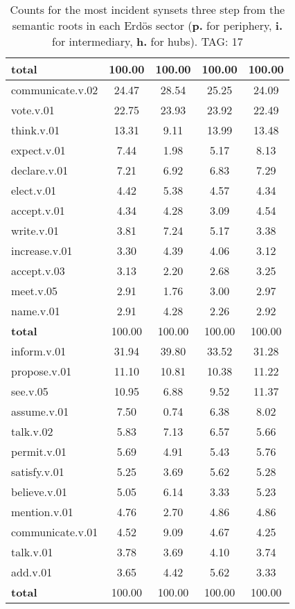 \begin{table}[h!]
\begin{center}
\begin{tabular}{| l || c | c | c | c |}
{{\bf total}} & 100.00  & 100.00  & 100.00  & 100.00 \\\hline\hline\hline
communicate.v.02 & 24.47  & 28.54  & 25.25  & 24.09 \\\hline
vote.v.01 & 22.75  & 23.93  & 23.92  & 22.49 \\\hline
think.v.01 & 13.31  & 9.11  & 13.99  & 13.48 \\\hline
expect.v.01 & 7.44  & 1.98  & 5.17  & 8.13 \\\hline
declare.v.01 & 7.21  & 6.92  & 6.83  & 7.29 \\\hline
elect.v.01 & 4.42  & 5.38  & 4.57  & 4.34 \\\hline
accept.v.01 & 4.34  & 4.28  & 3.09  & 4.54 \\\hline
write.v.01 & 3.81  & 7.24  & 5.17  & 3.38 \\\hline
increase.v.01 & 3.30  & 4.39  & 4.06  & 3.12 \\\hline
accept.v.03 & 3.13  & 2.20  & 2.68  & 3.25 \\\hline
meet.v.05 & 2.91  & 1.76  & 3.00  & 2.97 \\\hline
name.v.01 & 2.91  & 4.28  & 2.26  & 2.92 \\\hline\hline
{{\bf total}} & 100.00  & 100.00  & 100.00  & 100.00 \\\hline\hline\hline
inform.v.01 & 31.94  & 39.80  & 33.52  & 31.28 \\\hline
propose.v.01 & 11.10  & 10.81  & 10.38  & 11.22 \\\hline
see.v.05 & 10.95  & 6.88  & 9.52  & 11.37 \\\hline
assume.v.01 & 7.50  & 0.74  & 6.38  & 8.02 \\\hline
talk.v.02 & 5.83  & 7.13  & 6.57  & 5.66 \\\hline
permit.v.01 & 5.69  & 4.91  & 5.43  & 5.76 \\\hline
satisfy.v.01 & 5.25  & 3.69  & 5.62  & 5.28 \\\hline
believe.v.01 & 5.05  & 6.14  & 3.33  & 5.23 \\\hline
mention.v.01 & 4.76  & 2.70  & 4.86  & 4.86 \\\hline
communicate.v.01 & 4.52  & 9.09  & 4.67  & 4.25 \\\hline
talk.v.01 & 3.78  & 3.69  & 4.10  & 3.74 \\\hline
add.v.01 & 3.65  & 4.42  & 5.62  & 3.33 \\\hline\hline
{{\bf total}} & 100.00  & 100.00  & 100.00  & 100.00 \\\hline
\end{tabular}
\caption{Counts for the most incident synsets three step from the semantic roots in each Erd\"os sector ({\bf p.} for periphery, {\bf i.} for intermediary, {\bf h.} for hubs). TAG: 17}
\end{center}
\end{table}